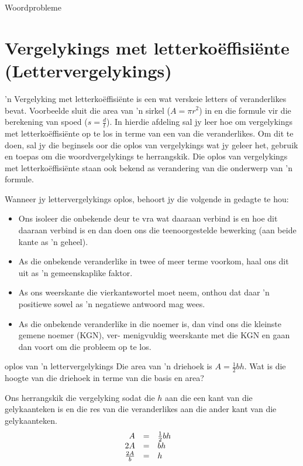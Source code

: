 \begin{aktiwiteit}{}
\begin{exercises}{Woordprobleme}
{\begin{enumerate}[noitemsep, label=\textbf{\arabic*}. ]
\end{enumerate}

}
\end{exercises}

\section{Vergelykings met letterkoëffisiënte (Lettervergelykings)}

’n Vergelyking met letterkoëffisiënte is een wat verskeie letters of veranderlikes bevat. Voorbeelde sluit die area
van ’n sirkel ($A=\pi{r}^{2}$) in en die formule vir die berekening van spoed ($s=\frac{d}{t}$). In hierdie afdeling sal jy leer hoe om vergelykings met letterkoëffisiënte op te los in terme van een van die veranderlikes. Om dit te doen, sal jy die beginsels oor die oplos van vergelykings wat jy geleer het, gebruik en toepas om die woordvergelykings te herrangskik. Die oplos van vergelykings met letterkoëffisiënte staan ook bekend as verandering van die onderwerp van ’n formule.
 
Wanneer jy lettervergelykings oplos, behoort jy die volgende in gedagte te hou:
\begin{itemize}
\item Ons isoleer die onbekende deur te vra wat daaraan verbind is en hoe dit daaraan verbind is en dan doen
ons die teenoorgestelde bewerking (aan beide kante as ’n geheel).
\item As die onbekende veranderlike in twee of meer terme voorkom, haal ons dit uit as ’n gemeenskaplike faktor. 
\item  As ons weerskante die vierkantswortel moet neem, onthou dat daar ’n positiewe sowel as ’n negatiewe
antwoord mag wees.
\item  As die onbekende veranderlike in die noemer is, dan vind ons die kleinste gemene noemer (KGN), ver-
menigvuldig weerskante met die KGN en gaan dan voort om die probleem op te los.
\end{itemize}


\begin{wex}
{oplos van 'n lettervergelykings}
{
Die area van ’n driehoek is $A=\frac{1}{2}bh$. Wat is die hoogte van die driehoek in terme van die basis en area?
}
{
Ons herrangskik die vergelyking sodat die $h$ aan die een kant
van die gelykaanteken is en die res van die veranderlikes aan die
ander kant van die gelykaanteken.
\begin{equation*}
    \begin{array}{cccc}\hfill A& =& \frac{1}{2}bh\hfill & \\
	\hfill 2A& =& bh\hfill & \hfill \\
	\hfill \frac{2A}{b}& =& h\hfill 
    \end{array}
\end{equation*}

}
\end{wex}
\end{aktiwiteit}
